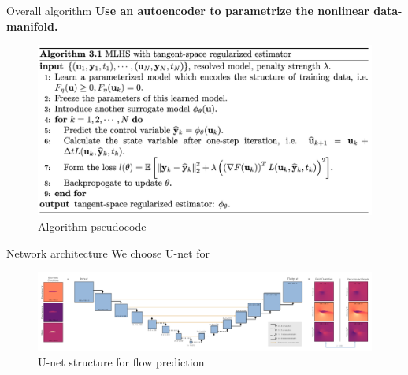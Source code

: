 \documentclass[paper slide]{beamer}
\begin{document}
\begin{frame}{Overall algorithm}
	\textbf{Use an autoencoder to parametrize the nonlinear data-manifold.}
	\begin{figure}
		\centering
		\centerline{\includegraphics[width=\linewidth]{fig/alg.jpg}}
		\caption{Algorithm pseudocode}
	  \end{figure}
\end{frame}

\begin{frame}{Network architecture}
	We choose U-net for 
	\begin{figure}[H]
          \centering
          \centerline{\includegraphics[width=1.1\linewidth]{fig/Unet.png}}
          \caption{U-net structure for flow prediction\footnotemark}
\end{figure}
\end{frame}
\end{document}
